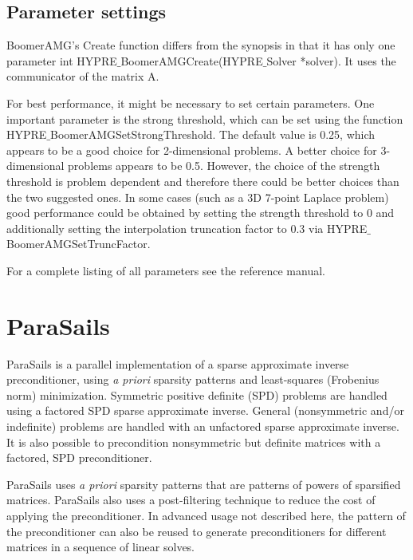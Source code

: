 
\subsection{Parameter settings}

BoomerAMG's Create function differs from the synopsis in that it has only one parameter
int HYPRE$\_$BoomerAMGCreate(HYPRE$\_$Solver *solver). It uses the communicator 
of the matrix A.

For best performance, it might be necessary to set certain parameters.
One important parameter is the strong threshold, which can be set
using the function HYPRE$\_$BoomerAMGSetStrongThreshold.
The default value is 0.25, which appears to be a good choice for 2-dimensional
problems. A better choice for 3-dimensional problems appears to be 0.5. However,
the choice of the strength threshold is problem dependent and therefore
there could be better choices than the two suggested ones.
In some cases (such as a 3D 7-point Laplace problem) good performance
could be obtained by setting the strength threshold to 0 and additionally
setting the interpolation truncation factor to 0.3 
via HYPRE$\_$BoomerAMGSetTruncFactor.

For a complete listing of all parameters see the reference manual.

\section{ParaSails}

ParaSails is a parallel implementation of a sparse approximate inverse
preconditioner, using {\em a priori} sparsity patterns and least-squares
(Frobenius norm) minimization.  Symmetric positive definite (SPD) problems
are handled using a factored SPD sparse approximate inverse.  General
(nonsymmetric and/or indefinite) problems are handled with an
unfactored sparse approximate inverse.  It is also possible to
precondition nonsymmetric but definite matrices with a factored, SPD
preconditioner.

ParaSails uses {\em a priori} sparsity patterns that are patterns of powers
of sparsified matrices.  ParaSails also uses a post-filtering technique
to reduce the cost of applying the preconditioner.  
In advanced usage not described here, the pattern of the
preconditioner can also be reused to generate preconditioners for different
matrices in a sequence of linear solves.

